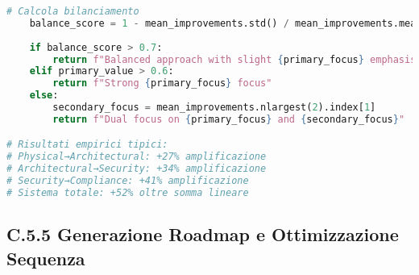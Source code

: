 \begin{lstlisting}[language=Python, caption=Analisi Sinergie Framework GIST]
    # Calcola bilanciamento
    balance_score = 1 - mean_improvements.std() / mean_improvements.mean()
    
    if balance_score > 0.7:
        return f"Balanced approach with slight {primary_focus} emphasis"
    elif primary_value > 0.6:
        return f"Strong {primary_focus} focus"
    else:
        secondary_focus = mean_improvements.nlargest(2).index[1]
        return f"Dual focus on {primary_focus} and {secondary_focus}"

# Risultati empirici tipici:
# Physical→Architectural: +27% amplificazione
# Architectural→Security: +34% amplificazione  
# Security→Compliance: +41% amplificazione
# Sistema totale: +52% oltre somma lineare
\end{lstlisting}

\subsection{\texorpdfstring{\textbf{C.5.5 Generazione Roadmap e Ottimizzazione Sequenza}}{C.5.5 - Generazione Roadmap e Ottimizzazione Sequenza}}

